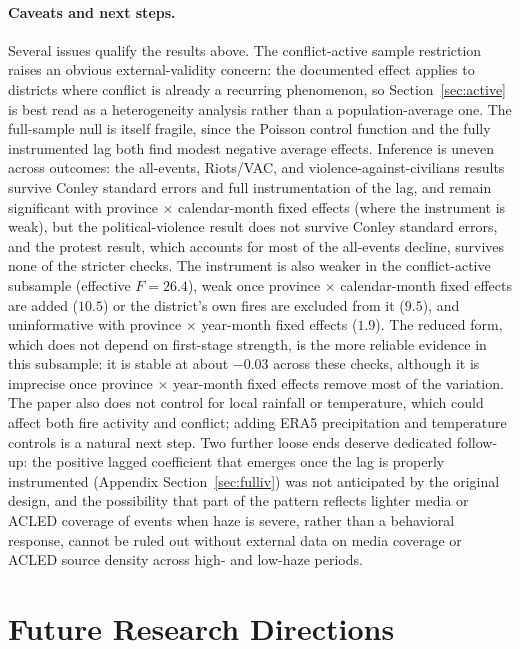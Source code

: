 \documentclass[12pt]{article}
\begin{document}
\paragraph{Caveats and next steps.} Several issues qualify the results above. The conflict-active sample restriction raises an obvious external-validity concern: the documented effect applies to districts where conflict is already a recurring phenomenon, so Section~\ref{sec:active} is best read as a heterogeneity analysis rather than a population-average one. The full-sample null is itself fragile, since the Poisson control function and the fully instrumented lag both find modest negative average effects. Inference is uneven across outcomes: the all-events, Riots/VAC, and violence-against-civilians results survive Conley standard errors and full instrumentation of the lag, and remain significant with province $\times$ calendar-month fixed effects (where the instrument is weak), but the political-violence result does not survive Conley standard errors, and the protest result, which accounts for most of the all-events decline, survives none of the stricter checks. The instrument is also weaker in the conflict-active subsample (effective $F = 26.4$), weak once province $\times$ calendar-month fixed effects are added ($10.5$) or the district's own fires are excluded from it ($9.5$), and uninformative with province $\times$ year-month fixed effects ($1.9$). The reduced form, which does not depend on first-stage strength, is the more reliable evidence in this subsample: it is stable at about $-0.03$ across these checks, although it is imprecise once province $\times$ year-month fixed effects remove most of the variation. The paper also does not control for local rainfall or temperature, which could affect both fire activity and conflict; adding ERA5 precipitation and temperature controls is a natural next step. Two further loose ends deserve dedicated follow-up: the positive lagged coefficient that emerges once the lag is properly instrumented (Appendix Section~\ref{sec:fulliv}) was not anticipated by the original design, and the possibility that part of the pattern reflects lighter media or ACLED coverage of events when haze is severe, rather than a behavioral response, cannot be ruled out without external data on media coverage or ACLED source density across high- and low-haze periods.

\section{Future Research Directions}
\label{sec:future}
\end{document}
